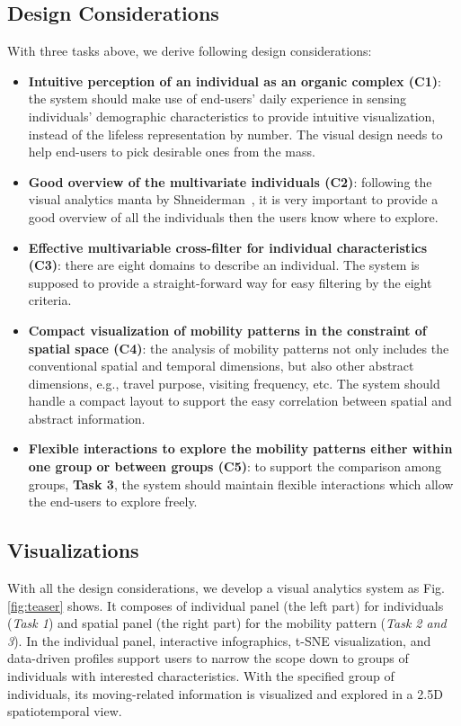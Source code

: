 \documentclass{ieeeaccess}
\begin{document}
\subsection{Design Considerations}

With three tasks above, we derive following design considerations:

\begin{itemize}
\item \textbf{Intuitive perception of an individual as an organic complex (C1)}: the system should make use of end-users' daily experience in sensing individuals' demographic characteristics to provide intuitive visualization, instead of the lifeless representation by number. The visual design needs to help end-users to pick desirable ones from the mass.
\item \textbf{Good overview of the multivariate individuals (C2)}: following the visual analytics manta by Shneiderman~\cite{RN459}, it is very important to provide a good overview of all the individuals then the users know where to explore.
\item \textbf{Effective multivariable cross-filter for individual characteristics (C3)}: there are eight domains to describe an individual. The system is supposed to provide a straight-forward way for easy filtering by the eight criteria.
\item \textbf{Compact visualization of mobility patterns in the constraint of spatial space (C4)}: the analysis of mobility patterns not only includes the conventional spatial and temporal dimensions, but also other abstract dimensions, e.g., travel purpose, visiting frequency, etc. The system should handle a compact layout to support the easy correlation between spatial and abstract information.
\item \textbf{Flexible interactions to explore the mobility patterns either within one group or between groups (C5)}: to support the comparison among groups, \textbf{Task 3}, the system should maintain flexible interactions which allow the end-users to explore freely.
\end{itemize}


\subsection{Visualizations}
\label{subsec:vis}

With all the design considerations, we develop a visual analytics system as Fig. \ref{fig:teaser} shows. It composes of individual panel (the left part) for individuals (\textit{Task 1}) and spatial panel (the right part) for the mobility pattern (\textit{Task 2 and 3}). In the individual panel, interactive infographics, t-SNE visualization, and data-driven profiles support users to narrow the scope down to groups of individuals with interested characteristics. With the specified group of individuals, its moving-related information is visualized and explored in a 2.5D spatiotemporal view.
\end{document}
